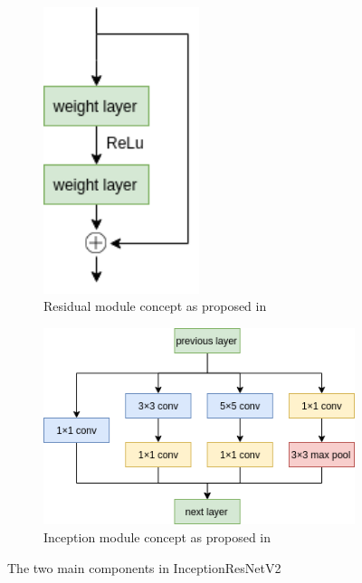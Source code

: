 \begin{figure}
     \centering
     \begin{subfigure}[t]{0.4\textwidth}
         \centering
         \includegraphics[width=0.5\textwidth]{methodology/figures/residual.png}
         \caption{Residual module concept as proposed in~\cite{DBLP:journals/corr/HeZRS15}}
         \label{fig:Residual}
     \end{subfigure}
     \hfill
     \begin{subfigure}[t]{0.55\textwidth}
         \centering
         \includegraphics[width=\textwidth]{methodology/figures/inception.png}
         \caption{Inception module concept as proposed in~\cite{DBLP:journals/corr/SzegedyLJSRAEVR14}}
         \label{fig:Inception}
     \end{subfigure}
     \caption{The two main components in InceptionResNetV2}
     \label{fig:IRV2modules}
\end{figure}

